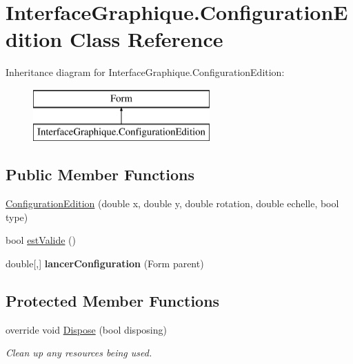 \hypertarget{class_interface_graphique_1_1_configuration_edition}{}\section{Interface\+Graphique.\+Configuration\+Edition Class Reference}
\label{class_interface_graphique_1_1_configuration_edition}
Inheritance diagram for Interface\+Graphique.\+Configuration\+Edition\+:\begin{figure}[H]
\begin{center}
\leavevmode
\includegraphics[height=2.000000cm]{class_interface_graphique_1_1_configuration_edition}
\end{center}
\end{figure}
\subsection*{Public Member Functions}
\begin{DoxyCompactItemize}
\item 
\hyperlink{group__inf2990_ga65140dfd1be09b8723103868ffa1fac6}{Configuration\+Edition} (double x, double y, double rotation, double echelle, bool type)
\item 
bool \hyperlink{group__inf2990_ga61bf31a8ba771a01a764748deade7f2d}{est\+Valide} ()
\item 
double\mbox{[},\mbox{]} {\bfseries lancer\+Configuration} (Form parent)
\end{DoxyCompactItemize}
\subsection*{Protected Member Functions}
\begin{DoxyCompactItemize}
\item 
override void \hyperlink{class_interface_graphique_1_1_configuration_edition_aebfc9dd762a317c3a6abf80c7398b1ce}{Dispose} (bool disposing)
\begin{DoxyCompactList}\small\item\em Clean up any resources being used. \end{DoxyCompactList}\end{DoxyCompactItemize}


